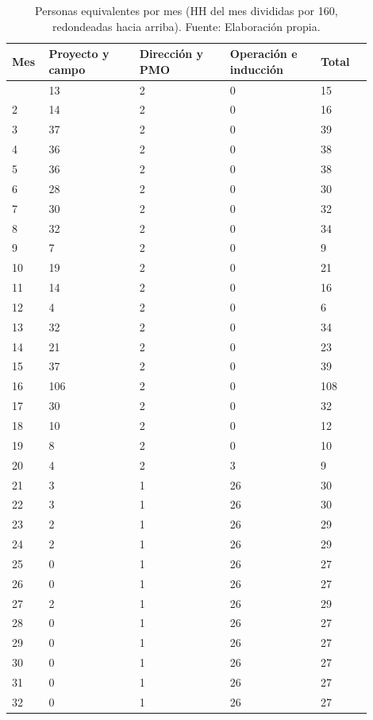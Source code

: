 \documentclass[11pt]{article}
\begin{document}
\begingroup
\small
\begin{longtable}{@{}p{0.08\linewidth}p{0.23\linewidth}p{0.23\linewidth}p{0.23\linewidth}p{0.13\linewidth}@{}}
\caption[Personas equivalentes por mes]{Personas equivalentes por mes (HH del mes divididas por 160, redondeadas hacia arriba). Fuente: Elaboración propia.}\label{tab:t15-8}\\
\toprule
\textbf{Mes} & \textbf{Proyecto y campo} & \textbf{Dirección y PMO} & \textbf{Operación e inducción} & \textbf{Total} \\
\midrule
\endhead
\bottomrule
\endlastfoot
1 & 13 & 2 & 0 & 15 \\
2 & 14 & 2 & 0 & 16 \\
3 & 37 & 2 & 0 & 39 \\
4 & 36 & 2 & 0 & 38 \\
5 & 36 & 2 & 0 & 38 \\
6 & 28 & 2 & 0 & 30 \\
7 & 30 & 2 & 0 & 32 \\
8 & 32 & 2 & 0 & 34 \\
9 & 7 & 2 & 0 & 9 \\
10 & 19 & 2 & 0 & 21 \\
11 & 14 & 2 & 0 & 16 \\
12 & 4 & 2 & 0 & 6 \\
13 & 32 & 2 & 0 & 34 \\
14 & 21 & 2 & 0 & 23 \\
15 & 37 & 2 & 0 & 39 \\
16 & 106 & 2 & 0 & 108 \\
17 & 30 & 2 & 0 & 32 \\
18 & 10 & 2 & 0 & 12 \\
19 & 8 & 2 & 0 & 10 \\
20 & 4 & 2 & 3 & 9 \\
21 & 3 & 1 & 26 & 30 \\
22 & 3 & 1 & 26 & 30 \\
23 & 2 & 1 & 26 & 29 \\
24 & 2 & 1 & 26 & 29 \\
25 & 0 & 1 & 26 & 27 \\
26 & 0 & 1 & 26 & 27 \\
27 & 2 & 1 & 26 & 29 \\
28 & 0 & 1 & 26 & 27 \\
29 & 0 & 1 & 26 & 27 \\
30 & 0 & 1 & 26 & 27 \\
31 & 0 & 1 & 26 & 27 \\
32 & 0 & 1 & 26 & 27 \\

\end{longtable}
\end{document}
